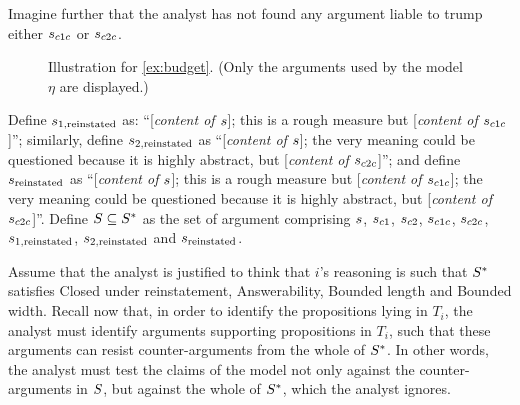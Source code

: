 \documentclass[smallextended,nospthms, natbib]{svjour3}
\begin{document}
\begin{example}
Imagine further that the analyst has not found any argument liable to trump either $s_{c1c}$ or $s_{c2c}$.

\begin{figure}
	\centering
	\caption{Illustration for \cref{ex:budget}. (Only the arguments used by the model $\eta$ are displayed.)}
	\label{fig:budget}
\end{figure}

Define $s_{1, \text{reinstated}}$ as: “[\emph{content of $s$}]; this is a rough measure but [\emph{content of $s_{c1c}$}]”; similarly, define $s_{2, \text{reinstated}}$ as “[\emph{content of $s$}]; the very meaning could be questioned because it is highly abstract, but [\emph{content of $s_{c2c}$}]”; and define $s_\text{reinstated}$ as “[\emph{content of $s$}]; this is a rough measure but [\emph{content of $s_{c1c}$}]; the very meaning could be questioned because it is highly abstract, but [\emph{content of $s_{c2c}$}]”. Define $S \subseteq S^*$ as the set of argument comprising $s$, $s_{c1}$, $s_{c2}$, $s_{c1c}$, $s_{c2c}$, $s_{1, \text{reinstated}}$, $s_{2, \text{reinstated}}$ and $s_\text{reinstated}$.

Assume that the analyst is justified to think that $i$'s reasoning is such that $S^*$ satisfies Closed under reinstatement, Answerability, Bounded length and Bounded width. Recall now that, in order to identify the propositions lying in $T_i$, the analyst must identify arguments supporting propositions in $T_i$, such that these arguments can resist counter-arguments from the whole of $S^*$. In other words, the analyst must test the claims of the model not only against the counter-arguments in $S$, but against the whole of $S^*$, which the analyst ignores.


\end{example}
\end{document}
